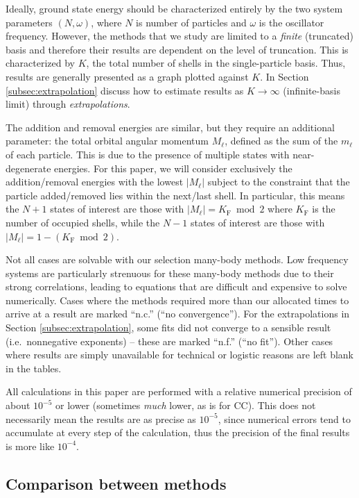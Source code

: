 Ideally, ground state energy should be characterized entirely by the two system parameters $(N, \omega)$, where $N$ is number of particles and $\omega$ is the oscillator frequency.  However, the methods that we study are limited to a \emph{finite} (truncated) basis and therefore their results are dependent on the level of truncation.  This is characterized by $K$, the total number of shells in the single-particle basis.  Thus, results are generally presented as a graph plotted against $K$.  In Section \ref{subsec:extrapolation} discuss how to estimate results as $K \to \infty$ (infinite-basis limit) through \textit{extrapolations}.

The addition and removal energies are similar, but they require an additional parameter: the total orbital angular momentum $M_\ell$, defined as the sum of the $m_\ell$ of each particle.  This is due to the presence of multiple states with near-degenerate energies.  For this paper, we will consider exclusively the addition/removal energies with the lowest $|M_\ell|$ subject to the constraint that the particle added/removed lies within the next/last shell.  In particular, this means the $N + 1$ states of interest are those with $|M_\ell| = K_{\mathrm{F}} \bmod 2$ where $K_{\mathrm{F}}$ is the number of occupied shells, while the $N - 1$ states of interest are those with $|M_\ell| = 1 - (K_{\mathrm{F}} \bmod 2)$.

Not all cases are solvable with our selection many-body methods.  Low frequency systems are particularly strenuous for these many-body methods due to their strong correlations, leading to equations that are difficult and expensive to solve numerically.  Cases where the methods required more than our allocated times to arrive at a result are marked ``n.c.'' (``no convergence'').  For the extrapolations in Section \ref{subsec:extrapolation}, some fits did not converge to a sensible result (i.e.\ nonnegative exponents) -- these are marked ``n.f.'' (``no fit'').  Other cases where results are simply unavailable for technical or logistic reasons are left blank in the tables.

All calculations in this paper are performed with a relative numerical precision of about $10^{-5}$ or lower (sometimes \emph{much} lower, as is for CC).  This does not necessarily mean the results are as precise as $10^{-5}$, since numerical errors tend to accumulate at every step of the calculation, thus the precision of the final results is more like $10^{-4}$.

\subsection{Comparison between methods}

